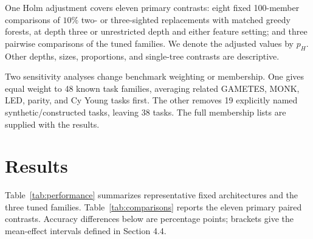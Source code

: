 \documentclass[final,5p,times]{elsarticle}
\begin{document}
One Holm adjustment \cite{holm1979sequential} covers eleven primary contrasts: eight fixed 100-member comparisons of $10\%$ two- or three-sighted replacements with matched greedy forests, at depth three or unrestricted depth and either feature setting; and three pairwise comparisons of the tuned families. We denote the adjusted values by $p_H$. Other depths, sizes, proportions, and single-tree contrasts are descriptive.

Two sensitivity analyses change benchmark weighting or membership. One gives equal weight to 48 known task families, averaging related GAMETES, MONK, LED, parity, and Cy Young tasks first. The other removes 19 explicitly named synthetic/constructed tasks, leaving 38 tasks. The full membership lists are supplied with the results.

\section{Results}

Table~\ref{tab:performance} summarizes representative fixed architectures
and the three tuned families. Table~\ref{tab:comparisons} reports the eleven
primary paired contrasts. Accuracy differences below are percentage points;
brackets give the mean-effect intervals defined in Section 4.4.
\end{document}

